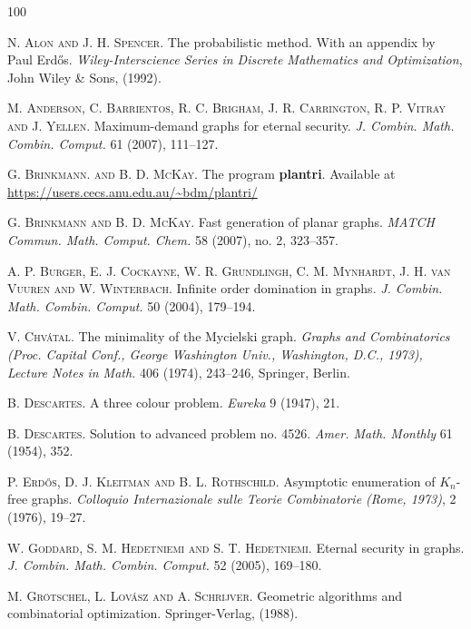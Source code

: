 \documentclass[11pt]{article}
\begin{document}
	\newpage
	\begin{thebibliography}{100}
	
	 \textsc{N. Alon and J. H. Spencer}. The probabilistic method. With an appendix by Paul Erdős. \textit{Wiley-Interscience Series in Discrete Mathematics and Optimization}, John Wiley \& Sons, (1992).
 
	 \textsc{M. Anderson, C. Barrientos, R. C. Brigham, J. R. Carrington, R. P. Vitray and J. Yellen}. Maximum-demand graphs for eternal security. \textit{J. Combin. Math. Combin. Comput.} 61 (2007), 111–127.
 
 	 \textsc{G. Brinkmann. and B. D. McKay}. The program \textbf{plantri}. Available at \url{https://users.cecs.anu.edu.au/~bdm/plantri/}
 	
 	 \textsc{G. Brinkmann and B. D. McKay}. Fast generation of planar graphs. \textit{MATCH Commun. Math. Comput. Chem.} 58 (2007), no. 2, 323–357. 
 	
 	 \textsc{A. P. Burger, E. J. Cockayne, W. R. Grundlingh, C. M. Mynhardt, J. H. van Vuuren and W. Winterbach}. Infinite order domination in graphs. \textit{J. Combin. Math. Combin. Comput.} 50 (2004), 179–194. 
 	
 	 \textsc{V. Chv{\'a}tal}. The minimality of the Mycielski graph. \textit{Graphs and Combinatorics (Proc. Capital Conf., George Washington Univ., Washington, D.C., 1973), Lecture Notes in Math.} 406 (1974), 243–246, Springer, Berlin.
 	
 	 \textsc{B. Descartes}. A three colour problem. \textit{Eureka} 9 (1947), 21.
 	
 	 \textsc{B. Descartes}. Solution to advanced problem no. 4526. \textit{Amer. Math. Monthly} 61 (1954), 352.
 	
 	 \textsc{P. Erd{\H{o}}s, D. J. Kleitman and B. L. Rothschild}. Asymptotic enumeration of $K_n$-free graphs. \textit{Colloquio Internazionale sulle Teorie Combinatorie (Rome, 1973)}, 2 (1976), 19–27. 
 	
 	 \textsc{W. Goddard, S. M. Hedetniemi and S. T. Hedetniemi}. Eternal security in graphs. \textit{J. Combin. Math. Combin. Comput.} 52 (2005), 169–180.
 	
 	 \textsc{M. Grötschel, L. Lovász and A. Schrijver}. Geometric algorithms and combinatorial optimization. Springer-Verlag, (1988).
 	

\end{thebibliography}
\end{document}
